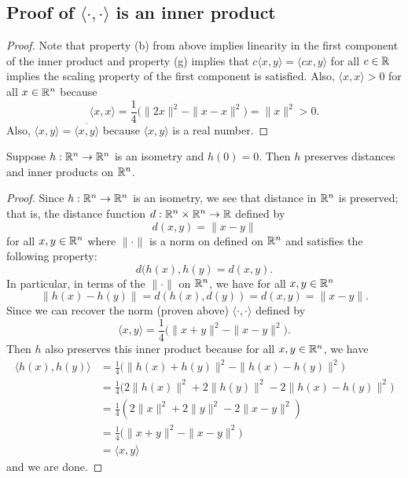 \documentclass[a4paper]{article}
\begin{document}
\subsection*{Proof of \( \langle \cdot , \cdot \rangle \) is an inner product}

\begin{proof}
Note that property (b) from above implies linearity in the first component of the inner product and property (g) implies that \( c \langle x  , y \rangle = \langle cx  ,  y  \rangle \) for all \( c \in \mathbb{R}  \) implies the scaling property of the first component is satisfied. Also, \( \langle x  , x \rangle > 0  \) for all \( x \in \mathbb{R}^{n} \) because 
\[  \langle x , x \rangle = \frac{ 1 }{ 4 } \Big(  \|2x \|^{2} - \|x - x\|^{2} \Big) = \|x\|^{2} > 0.   \]
Also, \( \langle x , y \rangle = \overline{\langle x , y \rangle } \) because \( \langle x  , y \rangle  \) is a real number.
\end{proof}


\begin{problem}
    Suppose \( h: \mathbb{R}^{n} \to \mathbb{R}^{n}  \) is an isometry and \( h(0) = 0  \). Then \( h  \) preserves distances and inner products on \( \mathbb{R}^{n} \). 
\end{problem}
\begin{proof}
Since \( h : \mathbb{R}^{n} \to \mathbb{R}^{n} \) is an isometry, we see that distance in \( \mathbb{R}^{n} \) is preserved; that is, the distance function \( d: \mathbb{R}^{n} \times \mathbb{R}^{n} \to \mathbb{R}  \) defined by 
    \[  d(x,y) = \|x - y\| \]
    for all \( x,y \in \mathbb{R}^{n} \) where \( \|\cdot\| \) is a norm on defined on \( \mathbb{R}^{n} \) and satisfies the following property:
    \[  d(h(x), h(y) = d(x,y). \]
   In particular, in terms of the \( \|\cdot\| \) on \( \mathbb{R}^{n} \), we have for all \( x,y \in \mathbb{R}^{n} \)
   \[ \|h(x) - h(y)\| = d(h(x),d(y)) = d(x,y) = \|x - y \|.  \]
   Since we can recover the norm (proven above) \( \langle \cdot , \cdot \rangle \) defined by
   \[  \langle x , y \rangle = \frac{ 1 }{ 4 }  \Big(  \|x + y\|^{2}  - \|x - y\|^{2} \Big). \]
   Then \( h  \) also preserves this inner product because for all \( x,y \in \mathbb{R}^{n} \), we have 
   \begin{align*}
       \langle h(x) , h(y)  \rangle &= \frac{ 1 }{ 4 }  \Big(  \|h(x)  + h(y) \|^{2} - \|h(x) - h(y)\|^{2} \Big) \\
                                    &= \frac{ 1 }{ 4 }  \Big(  2 \|h(x)\|^{2} + 2 \|h(y)\|^{2} - 2 \|h(x) - h(y)\|^{2} \Big) \\
                                    &= \frac{ 1 }{ 4 }  (2 \|x\|^{2} + 2 \|y\|^{2} - 2 \|x - y\|^{2}) \\
                                    &= \frac{ 1 }{ 4 }  \Big(  \|x + y \|^{2} - \|x - y\|^{2} \Big) \\
                                    &= \langle x , y \rangle 
   \end{align*}
   and we are done.
\end{proof}
\end{document}
